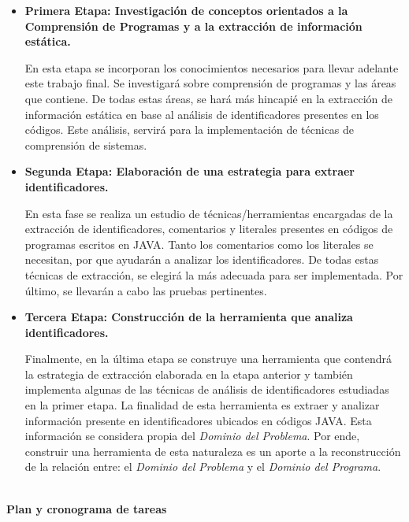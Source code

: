 \documentclass[a4paper,12pt]{article}
\begin{document}
\begin{itemize}
\renewcommand{\labelitemi}{$\circ$}%

\item \textbf{Primera Etapa: Investigación de conceptos orientados a la Comprensión de Programas y a la extracción de información estática.}

\hspace{0.5cm}En esta etapa se incorporan los conocimientos necesarios para llevar adelante este trabajo final. Se investigará sobre comprensión de programas y las áreas que contiene. De todas estas áreas, se hará más hincapié en la extracción de información estática en base al análisis de identificadores presentes en los códigos. Este análisis, servirá para la implementación de técnicas de comprensión de sistemas.

\item \textbf{Segunda Etapa: Elaboración de una estrategia para extraer\\ identificadores.}

\hspace{0.5cm} En esta fase se realiza un estudio de técnicas/herramientas encargadas de la extracción de identificadores, comentarios y literales presentes en códigos de programas escritos en JAVA. Tanto los comentarios como los literales se necesitan, por que ayudarán a analizar los identificadores. De todas estas técnicas de extracción, se elegirá la más adecuada para ser implementada. Por último, se llevarán a cabo las pruebas pertinentes.



\vskip0.5cm
\item \textbf{Tercera Etapa: Construcción de la herramienta que analiza\\identificadores.}

\hspace{0.5cm}Finalmente, en la última etapa se construye una herramienta que contendrá la estrategia de extracción elaborada en la etapa anterior y también implementa algunas de las técnicas de análisis de identificadores estudiadas en la primer etapa. La finalidad de esta herramienta es extraer y analizar información presente en identificadores ubicados en códigos JAVA. Esta información se considera propia del \textit{Dominio del Problema}. Por ende, construir una herramienta de esta naturaleza es un aporte a la reconstrucción de la relación entre: el \textit{Dominio del Problema} y el \textit{Dominio del Programa}.

\end{itemize}
\pagebreak
{\Large \textbf{\\Plan y cronograma de tareas}}
\end{document}
